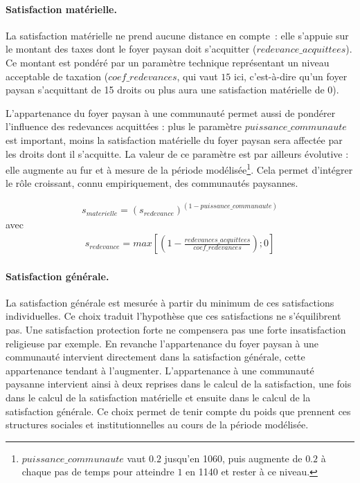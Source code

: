 \paragraph{Satisfaction matérielle.}

La satisfaction matérielle ne prend aucune distance en compte : elle s'appuie sur le montant des taxes dont le foyer paysan doit s'acquitter ($redevance\_acquittees$).
Ce montant est pondéré par un paramètre technique représentant un niveau \og acceptable\fg{} de taxation ($coef\_redevances$, qui vaut $15$ ici, c'est-à-dire qu'un foyer paysan s'acquittant de 15 droits ou plus aura une satisfaction matérielle de 0).

L'appartenance du foyer paysan à une communauté permet aussi de pondérer l'influence des redevances acquittées : plus le paramètre $puissance\_communaute$ est important, moins la satisfaction matérielle du foyer paysan sera affectée par les droits dont il s'acquitte.
La valeur de ce paramètre est par ailleurs évolutive : elle augmente au fur et à mesure de la période modélisée\footnote{
	$puissance\_communaute$ vaut $0.2$ jusqu'en 1060, puis augmente de $0.2$ à chaque pas de temps pour atteindre $1$ en 1140 et rester à ce niveau.
}.
Cela permet d'intégrer le rôle croissant, connu empiriquement, des communautés paysannes.


\begin{equation*}
\begin{gathered}
s_{materielle} = (s_{redevance})^{(1-puissance\_communaute)}
\end{gathered}
\end{equation*}
avec 
\begin{equation*}
\begin{gathered}
s_{redevance} = max \left[ \left( 1- \frac{redevances\_acquittees}{coef\_redevances} \right) ; 0 \right]
\end{gathered}
\end{equation*}

\paragraph{Satisfaction générale.}

La satisfaction générale est mesurée à partir du minimum de ces satisfactions individuelles.
Ce choix traduit l'hypothèse que ces satisfactions ne s'équilibrent pas.
Une \og satisfaction protection\fg{} forte ne compensera pas une forte insatisfaction religieuse par exemple.
En revanche l'appartenance du foyer paysan à une communauté intervient directement dans la satisfaction générale, cette appartenance tendant à l'augmenter.
L'appartenance à une communauté paysanne intervient ainsi à deux reprises dans le calcul de la satisfaction, une fois dans le calcul de la satisfaction matérielle et ensuite dans le calcul de la satisfaction générale.
Ce choix permet de tenir compte du poids que prennent ces structures sociales et institutionnelles au cours de la période modélisée.


